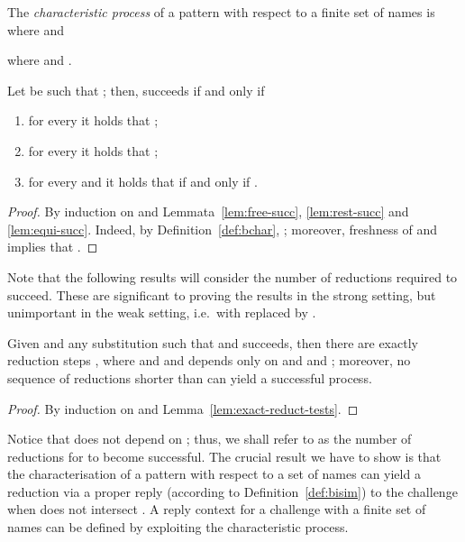 \documentclass{LMCS}
\begin{document}
\begin{defi}
\label{def:char}
The {\em characteristic process}  of a pattern  with respect to a finite set of names  is  where  and 

where  and
.
\end{defi}


\begin{lem}
\label{lem:theta-charP}
Let  be such that ; then,
 succeeds if and only if
\begin{enumerate}
\item for every  it holds that ;
\item for every  it holds that ;
\item for every  and  it holds that  if and only if .
\end{enumerate}
\end{lem}
\begin{proof}
By induction on  and Lemmata~\ref{lem:free-succ},
\ref{lem:rest-succ} and \ref{lem:equi-succ}. Indeed, by Definition~\ref{def:bchar},
; moreover, freshness of
 and  implies that .
\end{proof}

Note that the following results will consider the number of reductions required to succeed.
These are significant to proving the results in the strong setting, but unimportant in
the weak setting, i.e.\ with  replaced by .

\begin{lem}
\label{lem:min-reduct-charP}
Given  and any substitution 
such that  and  succeeds,
then there are exactly  reduction steps ,
where  and  and  depends only on  and  and ; moreover,
no sequence of reductions shorter than  can yield a successful process.
\end{lem}
\begin{proof}
By induction on  and Lemma~\ref{lem:exact-reduct-tests}.
\end{proof}

Notice that  does not depend on ; thus, we shall refer to  as the number of 
reductions for  to become successful.
The crucial result we have to show is that the characterisation of a pattern  with respect to a set of names  can yield a reduction via a proper reply (according to Definition~\ref{def:bisim}) to the challenge  when  does not intersect .
A reply context for a challenge  with a finite set of names  can be defined by exploiting the characteristic process.
\end{document}
